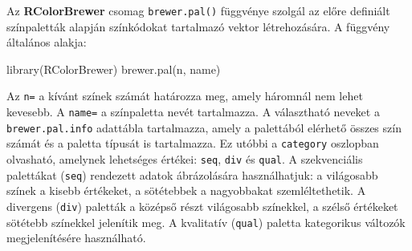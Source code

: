 \documentclass[
]{book}
\newenvironment{Shaded}{\begin{snugshade}}{\end{snugshade}}
\newcommand{\FunctionTok}[1]{\textcolor[rgb]{0.00,0.00,0.00}{#1}}
\newcommand{\NormalTok}[1]{#1}
\begin{document}
Az \textbf{RColorBrewer} csomag \texttt{brewer.pal()} függvénye szolgál az előre definiált színpaletták alapján színkódokat tartalmazó vektor létrehozására. A függvény általános alakja:

\begin{Shaded}
\begin{Highlighting}[]
\FunctionTok{library}\NormalTok{(RColorBrewer)}
\FunctionTok{brewer.pal}\NormalTok{(n, name)}
\end{Highlighting}
\end{Shaded}

Az \texttt{n=} a kívánt színek számát határozza meg, amely háromnál nem lehet kevesebb. A \texttt{name=} a színpaletta nevét tartalmazza. A választható neveket a \texttt{brewer.pal.info} adattábla tartalmazza, amely a palettából elérhető összes szín számát és a paletta típusát is tartalmazza. Ez utóbbi a \texttt{category} oszlopban olvasható, amelynek lehetséges értékei: \texttt{seq}, \texttt{div} és \texttt{qual}. A szekvenciális palettákat (\texttt{seq}) rendezett adatok ábrázolására használhatjuk: a világosabb színek a kisebb értékeket, a sötétebbek a nagyobbakat szemléltethetik. A divergens (\texttt{div}) paletták a középső részt világosabb színekkel, a szélső értékeket sötétebb színekkel jelenítik meg. A kvalitatív (\texttt{qual}) paletta kategorikus változók megjelenítésére használható.
\end{document}
